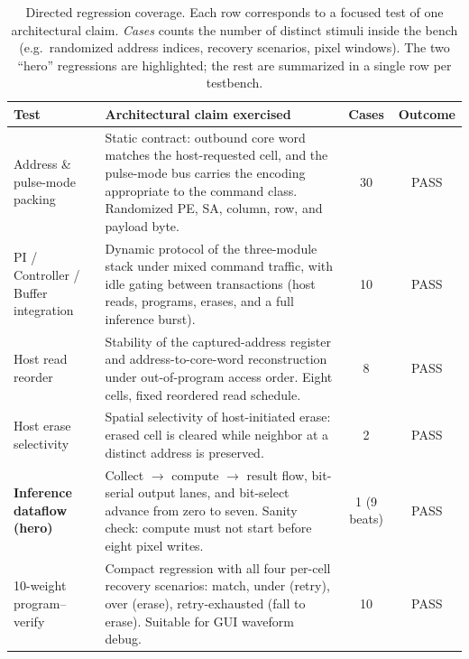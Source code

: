 \begin{table}[h]
    \centering
    \caption{Directed regression coverage. Each row corresponds to a
        focused test of one architectural claim. \emph{Cases} counts the
        number of distinct stimuli inside the bench (e.g.\ randomized
        address indices, recovery scenarios, pixel windows). The two
        ``hero'' regressions are highlighted; the rest are summarized in
        a single row per testbench.}
    \label{tab:results-summary}
    \begin{tabularx}{\linewidth}{l X c c}
        \toprule
        \textbf{Test} & \textbf{Architectural claim exercised} &
        \textbf{Cases} & \textbf{Outcome} \\
        \midrule
        Address \& pulse-mode packing &
            Static contract: outbound core word matches the
            host-requested cell, and the pulse-mode bus carries the
            encoding appropriate to the command class. Randomized PE,
            SA, column, row, and payload byte. &
            30 & PASS \\
        PI / Controller / Buffer integration &
            Dynamic protocol of the three-module stack under mixed
            command traffic, with idle gating between transactions
            (host reads, programs, erases, and a full inference burst). &
            10 & PASS \\
        Host read reorder &
            Stability of the captured-address register and
            address-to-core-word reconstruction under out-of-program
            access order. Eight cells, fixed reordered read schedule. &
            8 & PASS \\
        Host erase selectivity &
            Spatial selectivity of host-initiated erase: erased cell is
            cleared while neighbor at a distinct address is preserved. &
            2 & PASS \\
        \textbf{Inference dataflow (hero)} &
            Collect $\rightarrow$ compute $\rightarrow$ result flow,
            bit-serial output lanes, and bit-select advance from
            zero to seven. Sanity check: compute must not start before
            eight pixel writes. &
            1 (9 beats) & PASS \\
        10-weight program--verify &
            Compact regression with all four per-cell recovery scenarios:
            match, under (retry), over (erase), retry-exhausted (fall to
            erase). Suitable for GUI waveform debug. &
            10 & PASS \\

\end{tabularx}
\end{table}
